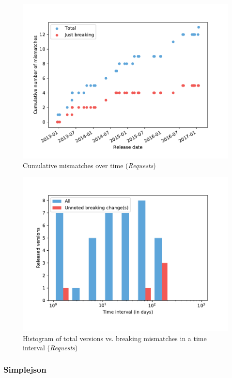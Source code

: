\documentclass{l4proj}
\begin{document}
\begin{figure}[]
\centering
\includegraphics[height=0.4\textheight]
{images/evaluation/requests_cumulative_mismatches}
\caption{Cumulative mismatches over time (\textit{Requests})}
\label{RequestsCumulativeMismatches}
\end{figure}

\begin{figure}[]
\centering
\includegraphics[height=0.4\textheight]
{images/evaluation/requests_introduced_changes}
\caption{Histogram of total versions vs. breaking mismatches in a time
interval (\textit{Requests})}
\label{RequestsHistogram}
\end{figure}

\subsubsection{Simplejson}
\end{document}
